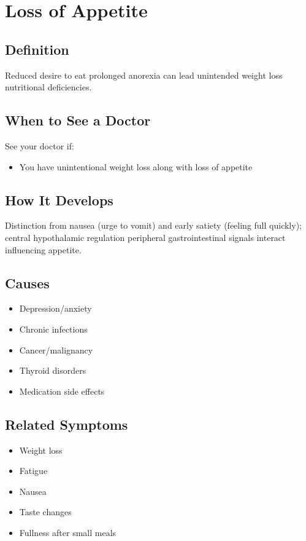 \chapter{Loss of Appetite}

\section*{Definition}
Reduced desire to eat prolonged anorexia can lead unintended weight loss nutritional deficiencies.

\section*{When to See a Doctor}
See your doctor if:
\begin{itemize}
  \item You have unintentional weight loss along with loss of appetite
\end{itemize}

\section*{How It Develops}
Distinction from nausea (urge to vomit) and early satiety (feeling full quickly); central hypothalamic regulation peripheral gastrointestinal signals interact influencing appetite.

\section*{Causes}
\begin{itemize}
  \item Depression/anxiety
  \item Chronic infections
  \item Cancer/malignancy
  \item Thyroid disorders
  \item Medication side effects
\end{itemize}

\section*{Related Symptoms}
\begin{itemize}
  \item Weight loss
  \item Fatigue
  \item Nausea
  \item Taste changes
  \item Fullness after small meals
\end{itemize}


